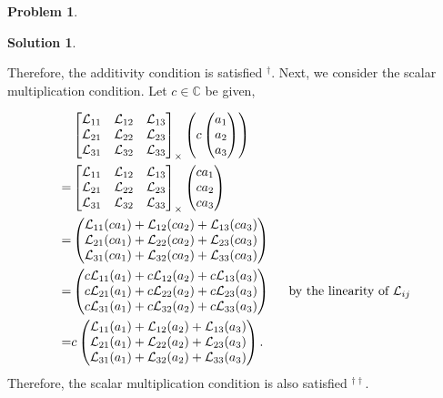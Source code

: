\documentclass{article}
\theoremstyle{definition}
\newtheorem*{prob*}{Problem}
\newtheorem*{sln*}{Solution}
\newcommand{\lag}{\mathcal{L}}
\begin{document}
\begin{prob*}
\begin{sln*}
\begin{enumerate}
			Therefore, the additivity condition is satisfied $^\dagger$. Next, we consider the scalar multiplication condition. Let $c \in \mathbb{C}$ be given,
			
			
			\begin{align*}
			&\begin{bmatrix}
			\lag_{11} & \lag_{12} & \lag_{13}\\
			\lag_{21} & \lag_{22} & \lag_{23}\\
			\lag_{31} & \lag_{32} & \lag_{33}
			\end{bmatrix}_\times 
			\left(c\begin{pmatrix}
			a_1 \\ a_2 \\ a_3
			\end{pmatrix}\right) \\
			= 
			&\begin{bmatrix}
			\lag_{11} & \lag_{12} & \lag_{13}\\
			\lag_{21} & \lag_{22} & \lag_{23}\\
			\lag_{31} & \lag_{32} & \lag_{33}
			\end{bmatrix}_\times 
			\begin{pmatrix}
			ca_1 \\ ca_2 \\ ca_3
			\end{pmatrix}\\
			=
			&\begin{pmatrix}
			\lag_{11}(ca_1) + \lag_{12}(ca_2) + \lag_{13}(ca_3)\\
			\lag_{21}(ca_1) + \lag_{22}(ca_2) + \lag_{23}(ca_3)\\
			\lag_{31}(ca_1) + \lag_{32}(ca_2) + \lag_{33}(ca_3)
			\end{pmatrix} \\
			=
			& \begin{pmatrix}
			c\lag_{11}(a_1) + c\lag_{12}(a_2) + c\lag_{13}(a_3)\\
			c\lag_{21}(a_1) + c\lag_{22}(a_2) + c\lag_{23}(a_3)\\
			c\lag_{31}(a_1) + c\lag_{32}(a_2) + c\lag_{33}(a_3)
			\end{pmatrix}\hspace{0.5cm}\text{by the linearity of $\lag_{ij}$}\\
			=
			& c\begin{pmatrix}
			\lag_{11}(a_1) + \lag_{12}(a_2) + \lag_{13}(a_3)\\
			\lag_{21}(a_1) + \lag_{22}(a_2) + \lag_{23}(a_3)\\
			\lag_{31}(a_1) + \lag_{32}(a_2) + \lag_{33}(a_3)
			\end{pmatrix}.
			\end{align*}
			Therefore, the scalar multiplication condition is also satisfied $^{\dagger\dagger}$.\\
			

\end{enumerate}
\end{sln*}
\end{prob*}
\end{document}
